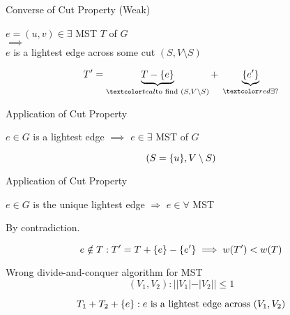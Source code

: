 \begin{frame}{}
  \begin{exampleblock}{Converse of Cut Property (Weak)}
    \begin{center}
      $e = (u,v) \in \exists$ MST $T$ of $G$ \\[6pt]
      $\implies$ \\[6pt]
      $e$ is a lightest edge across some cut $(S, V \setminus S)$
    \end{center}
  \end{exampleblock}

  \pause
  \[
    T' = \underbrace{T - \set{e}}_{\teal{\text{to find } (S, V \setminus S)}} +\; \underbrace{\set{e'}}_{\red{\exists?}}
  \]
\end{frame}

\begin{frame}{}
  \begin{exampleblock}{Application of Cut Property }
    \centerline{$e \in G$ is a lightest edge $\implies$ $e \in \exists$ MST of $G$}
  \end{exampleblock}

  \pause
  \[
    (S = \{u\}, V \setminus S)
  \]
\end{frame}

\begin{frame}{}
  \begin{exampleblock}{Application of Cut Property }
    \centerline{$e \in G$ is the unique lightest edge $\Rightarrow$ $e \in \forall$ MST}
  \end{exampleblock}

  \pause
  \vspace{0.50cm}
  \centerline{By contradiction.}
  \[
    e \notin T: T' = T + \{e\} - \{e'\} \implies w(T') < w(T)
  \]
\end{frame}

\begin{frame}{}
  \begin{exampleblock}{Wrong divide-and-conquer algorithm for MST }
    \[
      (V_{1}, V_{2}): ||V_{1}| - |V_{2}|| \le 1
    \]
    
    \[
      T_{1} + T_{2} + \{e\}: e \text{ is a lightest edge across } (V_{1}, V_{2})
    \]
  \end{exampleblock}

  \pause
  \vspace{0.30cm}
\end{frame}

